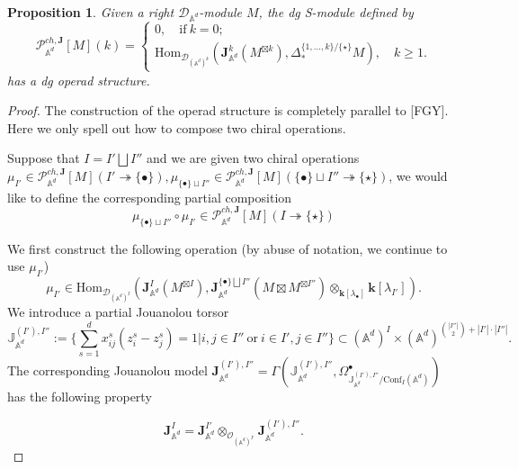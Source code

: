 \documentclass[11pt]{amsart}
\newtheorem{prop}[thm]{Proposition}
\theoremstyle{definition}
\theoremstyle{remark}
\numberwithin{equation}{section}
\begin{document}
\begin{prop}
Given a right $\mathcal{D}_{\mathbb{A}^d}$-module $M$, the dg S-module defined by
$$
\mathcal{P}^{ch,\mathbf{J}}_{\mathbb{A}^d}[M](k)=\begin{cases}
  0,\quad \text{if}\ k=0;\\
\mathrm{Hom}_{\mathcal{D}_{(\mathbb{A}^d)^{k}}}\left(\mathbf{J}_{\mathbb{A}^d}^{k}(M^{\boxtimes k}),\Delta^{\{1,\dots,k\}/\{\star\}}_*M\right),\quad k\geq 1.
\end{cases}
$$
has a dg operad structure.
\end{prop}
\begin{proof}
    The construction of the operad structure is completely parallel to [FGY]. Here we only spell out how to compose two chiral operations.

    Suppose that ${I}={I'}\bigsqcup {I''}$ and we are given two chiral operations $\mu_{{I'}}\in   \mathcal{P}^{ch,\mathbf{J}}_{\mathbb{A}^d}[M](I'\twoheadrightarrow \{\bullet\}),\mu_{\{\bullet\}\sqcup I''}\in \mathcal{P}^{ch,\mathbf{J}}_{\mathbb{A}^d}[M](\{\bullet\}\sqcup I''\twoheadrightarrow \{\star\})$, we would like to define the corresponding partial composition
    $$
    \mu_{\{\bullet\}\sqcup I''}\circ \mu_{ I'}\in \mathcal{P}^{ch,\mathbf{J}}_{\mathbb{A}^d}[M](I\twoheadrightarrow \{\star\})
    $$
    
    
    We first construct the following operation (by abuse of notation, we continue to use $\mu_{{I'}}$)
    \[
\mu_{{I'}}\in \mathrm{Hom}_{\mathcal{D}_{(\mathbb{A}^d)^{{I}}}}\left(\mathbf{J}_{\mathbb{A}^d}^{{I}}(M^{\boxtimes{I}}),\mathbf{J}^{\{\bullet\}\bigsqcup{I''}}_{\mathbb{A}^d}(M\boxtimes M^{\boxtimes{I''}})\otimes_{\mathbf{k}[\lambda_{\bullet}]}\mathbf{k}[\lambda_{I'}]\right).
\]
We introduce a partial Jouanolou torsor
$$
\mathbb{J}_{\mathbb{A}^d}^{({I'}),{I''}}:=\{\sum_{s=1}^d x_{ij}^s(z^s_i-z^s_j)=1|i,j\in I''\ \text{or}\  i\in I', j\in I''\}\subset (\mathbb{A}^d)^{{I}}\times (\mathbb{A}^d)^{\binom{|I''|}{2}+|I'|\cdot |I''|}.
$$
The corresponding Jouanolou model $\mathbf{J}_{\mathbb{A}^d}^{({I'}),{I''}}=\Gamma(\mathbb{J}_{\mathbb{A}^d}^{({I'}),{I''}},\Omega^{\bullet}_{\mathbb{J}_{\mathbb{A}^d}^{({I'}),{I''}}/\mathrm{Conf}_{ I}(\mathbb{A}^d)})$ has the following property

$$
\mathbf{J}_{\mathbb{A}^d}^{{I}}=\mathbf{J}_{\mathbb{A}^d}^{{I'}}\otimes_{\mathcal{O}_{(\mathbb{A}^d)^{{I'}}}} \mathbf{J}_{\mathbb{A}^d}^{({I'}),{I''}}.
$$


\end{proof}
\end{document}
